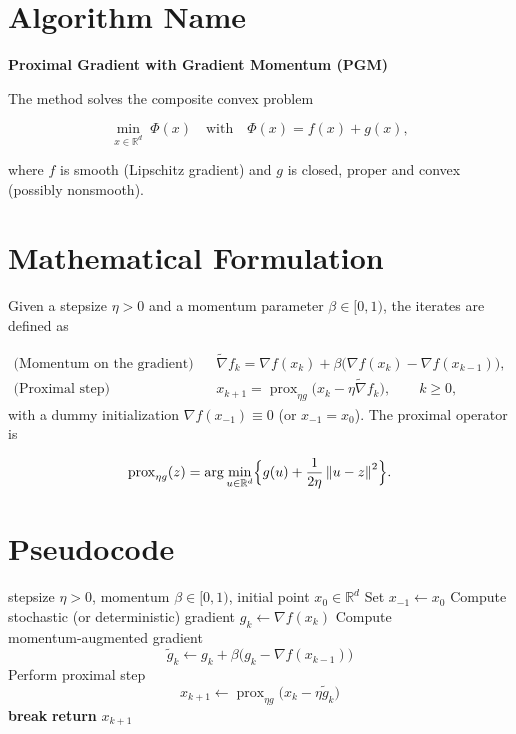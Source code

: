 \documentclass[11pt]{article}
\newcommand{\prox}{\operatorname{prox}}
\newcommand{\norm}[1]{\left\lVert #1\right\rVert}
\newcommand{\R}{\mathbb{R}}
\begin{document}
\section*{Algorithm Name}
\textbf{Proximal Gradient with Gradient Momentum (PGM)}  

The method solves the composite convex problem  

\[
\min_{x\in\R^{d}}\; \Phi(x)\quad\text{with}\quad \Phi(x)=f(x)+g(x),
\]

where $f$ is smooth (Lipschitz gradient) and $g$ is closed, proper and convex (possibly nonsmooth).

\vspace{0.2cm}
\section*{Mathematical Formulation}
Given a stepsize $\eta>0$ and a momentum parameter $\beta\in[0,1)$, the iterates are defined as  

\[
\begin{aligned}
\text{(Momentum on the gradient)}\qquad
&\tilde\nabla f_{k}= \nabla f(x_k)+\beta\bigl(\nabla f(x_k)-\nabla f(x_{k-1})\bigr), \tag{1}\\[4pt]
\text{(Proximal step)}\qquad
&x_{k+1}= \prox_{\eta g}\!\bigl(x_k-\eta \tilde\nabla f_{k}\bigr), \qquad k\ge 0,
\end{aligned}
\]
with a dummy initialization $\nabla f(x_{-1})\equiv 0$ (or $x_{-1}=x_0$).  
The proximal operator is  

\[
\prox_{\eta g}(z)=\arg\min_{u\in\R^{d}}\Bigl\{g(u)+\frac{1}{2\eta}\norm{u-z}^{2}\Bigr\}.
\]

\vspace{0.2cm}
\section*{Pseudocode}
\begin{algorithm}[H]
\caption{Proximal Gradient with Gradient Momentum (PGM)}
\begin{algorithmic}[1]
\Require stepsize $\eta>0$, momentum $\beta\in[0,1)$, initial point $x_{0}\in\R^{d}$
\State Set $x_{-1}\gets x_{0}$ 
    \State Compute stochastic (or deterministic) gradient $g_{k}\gets\nabla f(x_{k})$
    \State Compute momentum‑augmented gradient 
    \[
    \tilde g_{k}\gets g_{k}+\beta\bigl(g_{k}-\nabla f(x_{k-1})\bigr)
    \]
    \State Perform proximal step 
    \[
    x_{k+1}\gets \prox_{\eta g}\!\bigl(x_{k}-\eta \tilde g_{k}\bigr)
    \]
        \State \textbf{break}
    \EndIf
\EndFor
\State \textbf{return} $x_{k+1}$
\end{algorithmic}
\end{algorithm}
\end{document}

